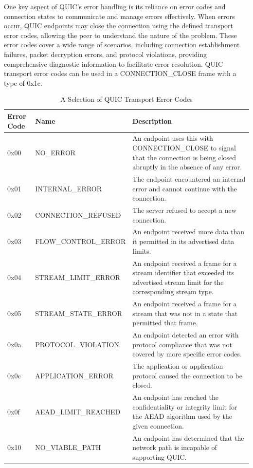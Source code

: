 One key aspect of QUIC's error handling is its reliance on error codes and connection states to communicate and manage errors effectively. When errors occur, QUIC endpoints may close the connection using the defined transport error codes, allowing the peer to understand the nature of the problem. These error codes cover a wide range of scenarios, including connection establishment failures, packet decryption errors, and protocol violations, providing comprehensive diagnostic information to facilitate error resolution. QUIC transport error codes can be used in a CONNECTION\_CLOSE frame with a type of 0x1c.

\begin{table}[H]
\begin{center}
    \begin{tabular}{| l | l | p{75mm} |}
    \hline
    Error Code & Name & Description \\ \hline
    0x00 & NO\_ERROR & An endpoint uses this with CONNECTION\_CLOSE to signal that the connection is being closed abruptly in the absence of any error. \\ \hline
    0x01 & INTERNAL\_ERROR & The endpoint encountered an internal error and cannot continue with the connection. \\ \hline
    0x02 & CONNECTION\_REFUSED & The server refused to accept a new connection. \\ \hline
    0x03 & FLOW\_CONTROL\_ERROR & An endpoint received more data than it permitted in its
advertised data limits. \\ \hline
    0x04 & STREAM\_LIMIT\_ERROR & An endpoint received a frame for a stream identifier that exceeded its advertised stream limit for the corresponding stream type. \\ \hline
    0x05 & STREAM\_STATE\_ERROR & An endpoint received a frame for a stream that was not in a state that permitted that frame. \\ \hline
    0x0a & PROTOCOL\_VIOLATION & An endpoint detected an error with protocol compliance that was not covered by more specific error codes. \\ \hline
    0x0c & APPLICATION\_ERROR & The application or application protocol caused the connection to
be closed. \\ \hline
    0x0f & AEAD\_LIMIT\_REACHED & An endpoint has reached the confidentiality or integrity limit
for the AEAD algorithm used by the given connection. \\ \hline
    0x10 & NO\_VIABLE\_PATH & An endpoint has determined that the network path is incapable of supporting QUIC. \\ \hline
    \end{tabular}
\end{center}
\caption{A Selection of QUIC Transport Error Codes \cite[121]{rfc9000}}
\label{tabelle_transport_error_codes}
\end{table}

